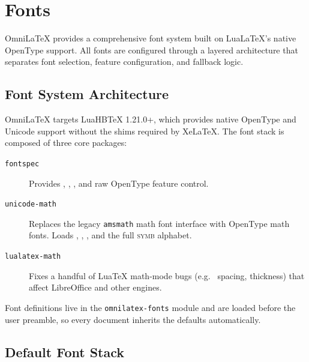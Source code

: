 \chapter{Fonts}
\label{ch:fonts}

OmniLaTeX provides a comprehensive font system built on LuaLaTeX's native OpenType
support. All fonts are configured through a layered architecture that separates
font selection, feature configuration, and fallback logic.

\section{Font System Architecture}

OmniLaTeX targets LuaHBTeX 1.21.0+, which provides native OpenType and
Unicode support without the shims required by XeLaTeX. The font stack is
composed of three core packages:

\begin{description}
  \item[{\texttt{fontspec}}] Provides , ,
    , and raw OpenType feature control.
  \item[{\texttt{unicode-math}}] Replaces the legacy \texttt{amsmath} math font
    interface with OpenType math fonts.  Loads , ,
    , and the full \textsc{symb} alphabet.
  \item[{\texttt{lualatex-math}}] Fixes a handful of LuaTeX math-mode bugs
    (e.g.\  spacing,  thickness) that affect
    LibreOffice and other engines.
\end{description}

Font definitions live in the \texttt{omnilatex-fonts} module and are loaded
before the user preamble, so every document inherits the defaults
automatically.

\section{Default Font Stack}


